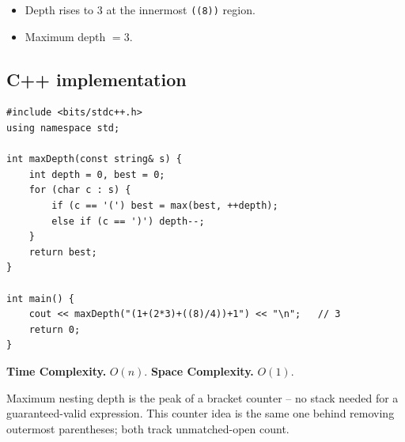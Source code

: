 
\begin{itemize}
  \item Depth rises to $3$ at the innermost \texttt{((8))} region.
  \item Maximum depth $=3$.
\end{itemize}

\subsection*{C++ implementation}

\begin{lstlisting}
#include <bits/stdc++.h>
using namespace std;

int maxDepth(const string& s) {
    int depth = 0, best = 0;
    for (char c : s) {
        if (c == '(') best = max(best, ++depth);
        else if (c == ')') depth--;
    }
    return best;
}

int main() {
    cout << maxDepth("(1+(2*3)+((8)/4))+1") << "\n";   // 3
    return 0;
}
\end{lstlisting}

\begin{complexitybox}
\textbf{Time Complexity.} $O(n)$. \textbf{Space Complexity.} $O(1)$.
\end{complexitybox}

\begin{takeawaybox}
Maximum nesting depth is the peak of a bracket counter -- no stack needed
for a guaranteed-valid expression. This counter idea is the same one behind
removing outermost parentheses; both track unmatched-open count.
\end{takeawaybox}
